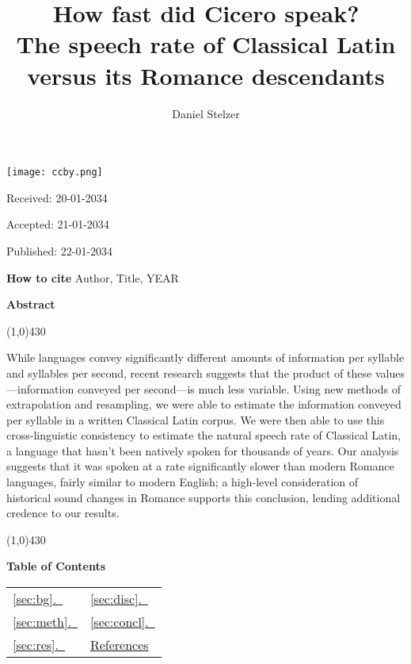 \documentclass[12pt,twoside]{article}
\title{{\Huge{}How fast did Cicero speak?}\\{\Large{}The speech rate of Classical Latin versus its Romance descendants}}
\author{Daniel Stelzer}
\affil{University of Illinois at Urbana-Champaign\\stelzer3@illinois.edu}
\date{}
\makeatletter
\newcommand*{\tocref}[1]{\hyperref[{#1}]{\ref*{#1}.~\nameref*{#1}}}
\def\maketitle{{%
		\renewenvironment{tabular}[2][]
		{\begin{flushleft}}
			{\end{flushleft}}
		\AB@maketitle}}
\makeatother
\begin{document}
\maketitle

\thispagestyle{first}

\vspace{0.5cm}
\noindent \texttt{[image: ccby.png]}

\hfill Received: 20-01-2034 

\hfill Accepted: 21-01-2034

\hfill Published: 22-01-2034

\vspace{1cm}

\noindent \textbf{How to cite} Author, Title, YEAR

\vspace{1.5cm}

\noindent \textbf{Abstract}
\begin{center}
 	\line(1,0){430}
\end{center}
\vspace{-0,3cm}
\noindent While languages convey significantly different amounts of information per syllable and syllables per second, recent research suggests that the product of these values---information conveyed per second---is much less variable. Using new methods of extrapolation and resampling, we were able to estimate the information conveyed per syllable in a written Classical Latin corpus. We were then able to use this cross-linguistic consistency to estimate the natural speech rate of Classical Latin, a language that hasn't been natively spoken for thousands of years. Our analysis suggests that it was spoken at a rate significantly slower than modern Romance languages, fairly similar to modern English; a high-level consideration of historical sound changes in Romance supports this conclusion, lending additional credence to our results. \\
\vspace{-0,4cm}
\begin{center}
	\line(1,0){430}
\end{center}

\begin{center}
	\textbf{Table of Contents}
\end{center}

\begin{large}
\begin{center}
	\begin{tabular}{l l}
		\tocref{sec:bg} & \tocref{sec:disc} \\
		\tocref{sec:meth} & \tocref{sec:concl} \\
		\tocref{sec:res} & \hyperref[sec:refs]{References} \\
	\end{tabular}
\end{center}
\end{large}
\end{document}
